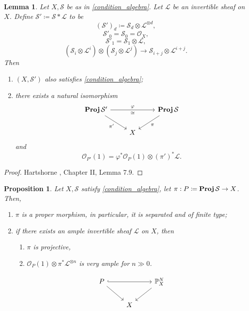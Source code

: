 \documentclass[12pt]{article}
\DeclareMathOperator{\relProj}{\textnormal{\textbf{Proj}}}
\newtheorem*{proposition}{Proposition}
\newtheorem*{lemma}{Lemma}
\theoremstyle{definition}
\theoremstyle{remark}
\begin{document}
\begin{lemma}
Let $X,\mathcal{S}$ be as in \eqref{condition_algebra}. Let $\mathcal{L}$ be an invertible sheaf on $X$. Define $\mathcal{S}'\coloneqq\mathcal{S}*\mathcal{L}$ to be
\[(\mathcal{S}')_d\coloneqq\mathcal{S}_d\otimes\mathcal{L}^{\otimes d},\]
\[\mathcal{S}'_0=\mathcal{S}_0=\mathcal{O}_X,\]
\[\mathcal{S}'_1=\mathcal{S}_1\otimes\mathcal{L},\]
\[(\mathcal{S}_i\otimes\mathcal{L}^i)\otimes(\mathcal{S}_j\otimes\mathcal{L}^j)\longrightarrow\mathcal{S}_{i+j}\otimes\mathcal{L}^{i+j}.\]
Then
\begin{enumerate}[label=\arabic*)]
\item $(X,\mathcal{S}')$ also satisfies \eqref{condition_algebra};

\item there exists a natural isomorphism
\[
\begin{tikzcd}
\relProj\mathcal{S}'\arrow[rr,"\varphi","\cong"']\arrow[rd,"\pi'",swap]&&\relProj\mathcal{S}\arrow[ld,"\pi"]\\
&X
\end{tikzcd}
\]
and
\[\mathcal{O}_{P'}(1)=\varphi^*\mathcal{O}_P(1)\otimes(\pi')^*\mathcal{L}.\]
\end{enumerate}
\end{lemma}

\begin{proof}
Hartshorne \cite{hartshorne2013algebraic}, Chapter II, Lemma 7.9.
\end{proof}

\begin{proposition}
Let $X,\mathcal{S}$ satisfy \eqref{condition_algebra}, let $\pi:P\coloneqq\relProj\mathcal{S}\rightarrow X$. Then,
\begin{enumerate}[label=\arabic*)]
\item $\pi$ is a proper morphism, in particular, it is separated and of finite type;
\item if there exists an ample invertible sheaf $\mathcal{L}$ on $X$, then
\begin{enumerate}[label=\roman*)]
\item $\pi$ is projective,
\item $\mathcal{O}_P(1)\otimes\pi^*\mathcal{L}^{\otimes n}$ is very ample for $n\gg0$.
\end{enumerate}
\[
\begin{tikzcd}
P\arrow[rr,hook]\arrow[rd]&&\mathbb{P}_X^N\arrow[ld]\\
&X
\end{tikzcd}
\]
\end{enumerate}
\end{proposition}
\end{document}
